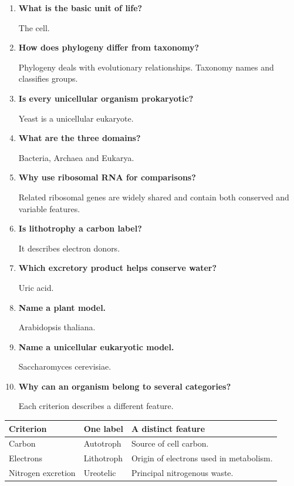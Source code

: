 \documentclass[12pt,a4paper]{article}
\newcommand{\Q}[1]{\textbf{#1}\par\noindent\ignorespaces}
\begin{document}
\begin{tcolorbox}[exambox, title={Frequently Asked / Viva Questions}]
\begin{enumerate}[topsep=0pt, label=\textbf{Q\arabic*.}, itemsep=5pt, leftmargin=*]
  \item \Q{What is the basic unit of life?}
    The cell.
  \item \Q{How does phylogeny differ from taxonomy?}
    Phylogeny deals with evolutionary relationships. Taxonomy names and classifies groups.
  \item \Q{Is every unicellular organism prokaryotic?}
    Yeast is a unicellular eukaryote.
  \item \Q{What are the three domains?}
    Bacteria, Archaea and Eukarya.
  \item \Q{Why use ribosomal RNA for comparisons?}
    Related ribosomal genes are widely shared and contain both conserved and variable features.
  \item \Q{Is lithotrophy a carbon label?}
    It describes electron donors.
  \item \Q{Which excretory product helps conserve water?}
    Uric acid.
  \item \Q{Name a plant model.}
    Arabidopsis thaliana.
  \item \Q{Name a unicellular eukaryotic model.}
    Saccharomyces cerevisiae.
  \item \Q{Why can an organism belong to several categories?}
    Each criterion describes a different feature.
\end{enumerate}
\end{tcolorbox}

\begin{tcolorbox}[tikzbox, title={Summary Comparison}]
\par\vspace{5pt}
\begingroup
\setlength{\extrarowheight}{1pt}
\noindent\begin{tabularx}{\linewidth}{|B{3.45cm}|Y|Y|}
\hline
\textbf{Criterion} & \textbf{One label} & \textbf{A distinct feature} \\ \hline
Carbon & Autotroph & Source of cell carbon. \\ \hline
Electrons & Lithotroph & Origin of electrons used in metabolism. \\ \hline
Nitrogen excretion & Ureotelic & Principal nitrogenous waste. \\ \hline
\end{tabularx}\par
\endgroup
\end{tcolorbox}
\end{document}
